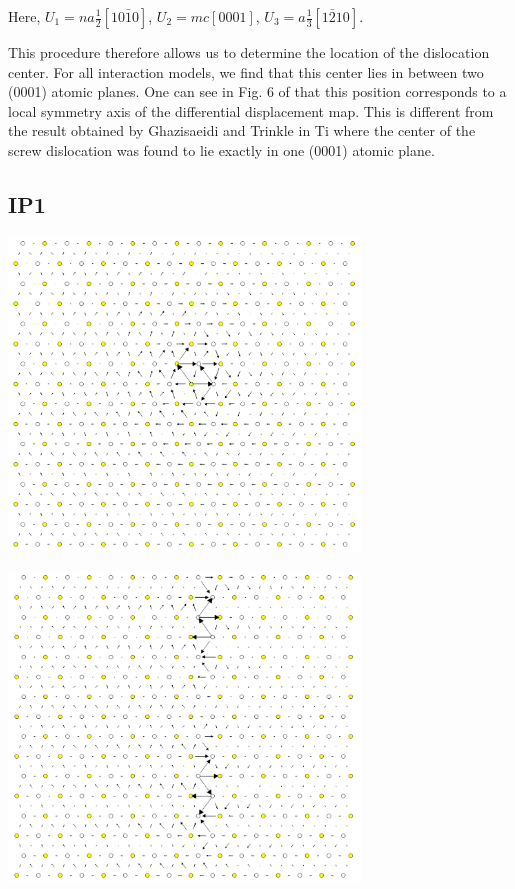 \documentclass[11pt]{article}
\begin{document}
Here, \(U_1 = na \frac{1}{2} [10\bar{1}0]\), \(U_2 = mc [0001]\), 
\(U_3 =  a \frac{1}{3} [1\bar{2}10]\).

This procedure therefore allows us to determine the location of
the dislocation center. For all interaction models, we find that
this center lies in between two (0001) atomic planes. One can see
in Fig. 6 of \cite{Clouet2012} that this position corresponds to a
local symmetry axis of the differential displacement map. This is
different from the result obtained by Ghazisaeidi and Trinkle
\cite{Ghazisaeidi2012} in Ti where the center of the screw
dislocation was found to lie exactly in one (0001) atomic plane.

\newpage


\subsection{IP1}
\label{sec:orge3d23f7}
\begin{center}
\includegraphics[width=0.7\textwidth]{Images/final_model_IP1_partial_dd_initial.png}
\end{center}
\begin{center}
\includegraphics[width=0.7\textwidth]{Images/final_model_IP1_partial_dd_final.png}
\end{center} 
\end{document}
